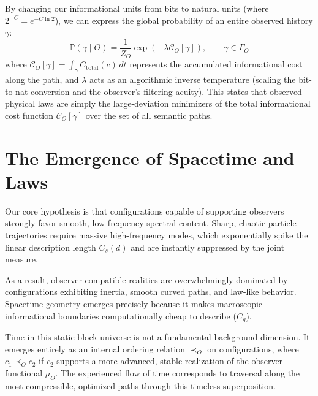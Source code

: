 By changing our informational units from bits to natural units (where $2^{-C} = e^{-C \ln 2}$), we can express the global probability of an entire observed history $\gamma$:
\[
\mathbb{P}(\gamma \mid O) = \frac{1}{Z_O} \exp\left(-\lambda\mathcal{C}_O[\gamma]\right), \qquad \gamma \in \Gamma_O
\]
where $\mathcal{C}_O[\gamma] = \int_{\gamma} C_{\text{total}}(c)\, dt$ represents the accumulated informational cost along the path, and $\lambda$ acts as an algorithmic inverse temperature (scaling the bit-to-nat conversion and the observer's filtering acuity).
This states that observed physical laws are simply the large-deviation minimizers of the total informational cost function $\mathcal{C}_O[\gamma]$ over the set of all semantic paths.




\section{The Emergence of Spacetime and Laws}

Our core hypothesis is that configurations capable of supporting observers strongly favor smooth, low-frequency spectral content.
Sharp, chaotic particle trajectories require massive high-frequency modes, which exponentially spike the linear description length $C_s(d)$ and are instantly suppressed by the joint measure. 

As a result, observer-compatible realities are overwhelmingly dominated by configurations exhibiting inertia, smooth curved paths, and law-like behavior.
Spacetime geometry emerges precisely because it makes macroscopic informational boundaries computationally cheap to describe ($C_g$). 

Time in this static block-universe is not a fundamental background dimension.
It emerges entirely as an internal ordering relation $\prec_O$ on configurations, where $c_1 \prec_O c_2$ if $c_2$ supports a more advanced, stable realization of the observer functional $\mu_O$.
The experienced flow of time corresponds to traversal along the most compressible, optimized paths through this timeless superposition.



